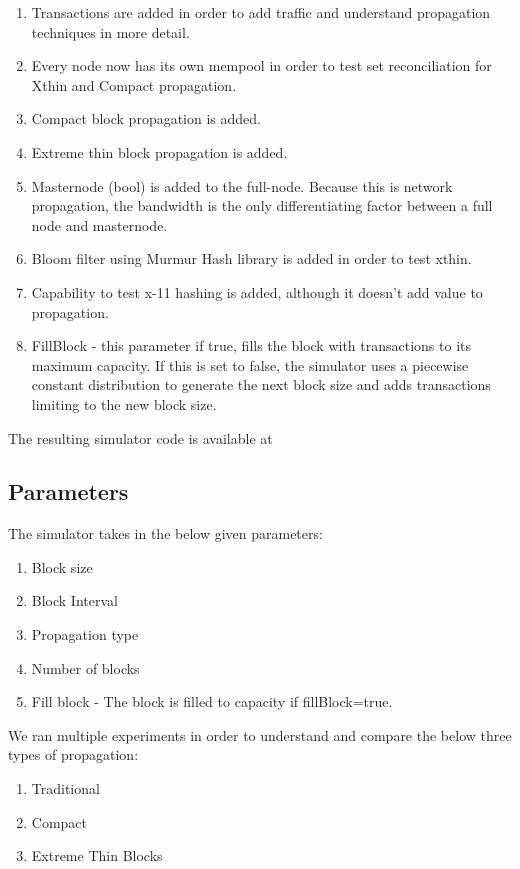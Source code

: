\begin{enumerate}
    \item Transactions are added in order to add traffic and understand
        propagation techniques in more detail.
    \item Every node now has its own mempool in order to test set reconciliation
        for Xthin and Compact propagation.
    \item Compact block propagation is added.
    \item Extreme thin block propagation is added.
    \item Masternode (bool) is added to the full-node. Because this is network
        propagation, the bandwidth is the only differentiating factor between a
        full node and masternode.
    \item Bloom filter using Murmur Hash library is added in order to test
        xthin.
    \item Capability to test x-11 hashing is added, although it doesn't add
        value to propagation.
    \item FillBlock - this parameter if true, fills the block with transactions
        to its maximum capacity. If this is set to false, the simulator uses a
        piecewise constant distribution to generate the next block size and adds
        transactions limiting to the new block size.
\end{enumerate}

The resulting simulator code is available at \cite{nakul}

\subsection{Parameters}
The simulator takes in the below given parameters:

\begin{enumerate}
    \item Block size
    \item Block Interval
    \item Propagation type
    \item Number of blocks
    \item Fill block - The block is filled to capacity if fillBlock=true.
\end{enumerate}

We ran multiple experiments in order to understand and compare the below three
types of propagation:

\begin{enumerate}
    \item Traditional
    \item Compact
    \item Extreme Thin Blocks
\end{enumerate}

